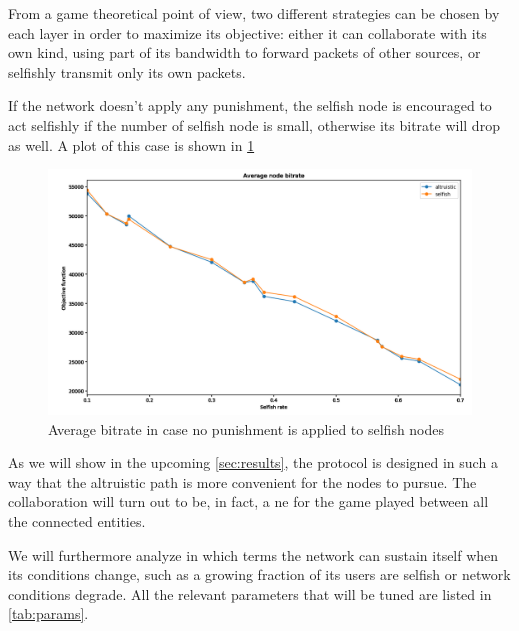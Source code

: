 \documentclass[conference]{IEEEtran}
\begin{document}
From a game theoretical point of view, two different strategies can be chosen by each layer in order to maximize its objective: either it can collaborate with its own kind, using part of its bandwidth to forward packets of other sources, or selfishly transmit only its own packets.

If the network doesn't apply any punishment, the selfish node is encouraged to act selfishly if the number of selfish node is small, otherwise its bitrate will drop as well. A plot of this case is shown in \ref{fig:no-blame}

\begin{figure}

  \includegraphics[width=\linewidth]{figures/app_rate_0_1-no-punish.png}

  \caption{Average bitrate in case no punishment is applied to selfish nodes}
  \label{fig:no-blame}
\end{figure}

As we will show in the upcoming \autoref{sec:results}, the protocol is designed in such a way that the altruistic path is more convenient for the nodes to pursue. The collaboration will turn out to be, in fact, a \gls{ne} for the game played between all the connected entities.

We will furthermore analyze in which terms the network can sustain itself when its conditions change, such as a growing fraction of its users are selfish or network conditions degrade.
All the relevant parameters that will be tuned are listed in \autoref{tab:params}.

\renewcommand\theadalign{l}
\end{document}
